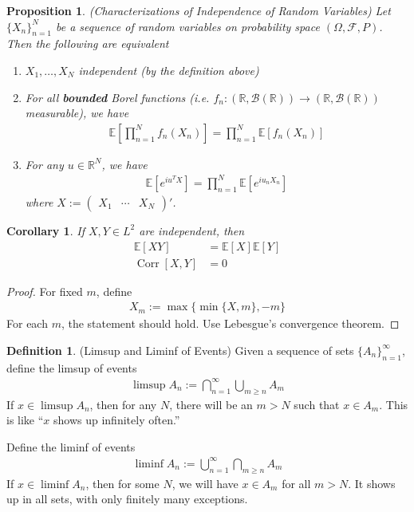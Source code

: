 \documentclass[12pt]{article}
\theoremstyle{plain}
\newtheorem{prop}[thm]{Proposition}
\newtheorem{cor}[thm]{Corollary}
\theoremstyle{definition}
\newtheorem{defn}[thm]{Definition}
\theoremstyle{remark}
\newcommand{\ra}{\rightarrow}
\newcommand{\sF}{\mathscr{F}}
\newcommand{\sB}{\mathscr{B}}
\newcommand{\R}{\mathbb{R}}
\newcommand{\E}{\mathbb{E}}
\newcommand{\Corr}{\operatorname{Corr}}
\newcommand{\ninf}{_{n=1}^\infty}
\newcommand{\nN}{_{n=1}^N}
\begin{document}
\begin{prop}\emph{(Characterizations of Independence of Random Variables)}
Let $\{X_n\}\nN$ be a sequence of random variables on probability space
$(\Omega,\sF,P)$. Then the following are equivalent
\begin{enumerate}
  \item $X_1,\ldots,X_N$ independent (by the definition above)
  \item For all \textbf{bounded} Borel functions (i.e.
    $f_n:(\R,\sB(\R)) \ra (\R,\sB(\R))$ measurable), we have
    \begin{align*}
      \E\left[\prod\nN f_n(X_n)\right]
      =
      \prod\nN \E\left[f_n(X_n)\right]
    \end{align*}
  \item For any $u\in \R^N$, we have
    \begin{align*}
      \E\left[e^{iu^T X}\right]
      =
      \prod\nN \E\left[e^{iu_n X_n}\right]
    \end{align*}
    where $X := \begin{pmatrix} X_1 &\cdots & X_N \end{pmatrix}'$.
\end{enumerate}
\end{prop}
\begin{cor}
If $X,Y\in L^2$ are independent, then
\begin{align*}
  \E[XY] &= \E[X]\E[Y] \\
  \Corr[X,Y] &= 0
\end{align*}
\end{cor}
\begin{proof}
For fixed $m$, define
\begin{align*}
  X_m := \max\{\min\{X,m\}, -m\}
\end{align*}
For each $m$, the statement should hold. Use Lebesgue's convergence
theorem.
\end{proof}

\begin{defn}(Limsup and Liminf of Events)
Given a sequence of sets $\{A_n\}\ninf$, define the limsup of events
\begin{align*}
  \limsup A_n := \bigcap\ninf \bigcup_{m \geq n} A_m
\end{align*}
If $x\in \limsup A_n$, then for any $N$, there will be an $m>N$ such
that $x\in A_m$. This is like ``$x$ shows up infinitely often.''

Define the liminf of events
\begin{align*}
  \liminf A_n := \bigcup\ninf \bigcap_{m \geq n} A_m
\end{align*}
If $x\in \liminf A_n$, then for some $N$, we will have $x\in A_m$ for
all $m > N$. It shows up in all sets, with only finitely many
exceptions.
\end{defn}
\end{document}
